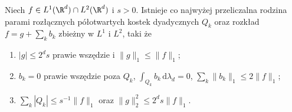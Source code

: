 \begin{lemat}
\label{lem:pde16-cz-decomp}
Niech $f\in L^1(\R^d)\cap L^2(\R^d)$ i $s>0$. Istnieje
co najwyżej przeliczalna rodzina parami rozłącznych półotwartych
kostek dyadycznych $Q_k$ oraz rozkład $f=g+\sum_k b_k$
zbieżny w $L^1$ i $L^2$, taki że
\begin{enumerate}[label=(\roman*)]
\item $|g|\le 2^ds$ prawie wszędzie i $\|g\|_1\le\|f\|_1$;
\item $b_k=0$ prawie wszędzie poza $Q_k$,
 $\int_{Q_k} b_k\,\mathrm d\lambda_d=0$,
 $\sum_k\|b_k\|_1\le2\|f\|_1$;
\item $\sum_k|Q_k|\le s^{-1}\|f\|_1$ oraz
 $\|g\|_2^2\le 2^ds\|f\|_1$.
\end{enumerate}
\end{lemat}
